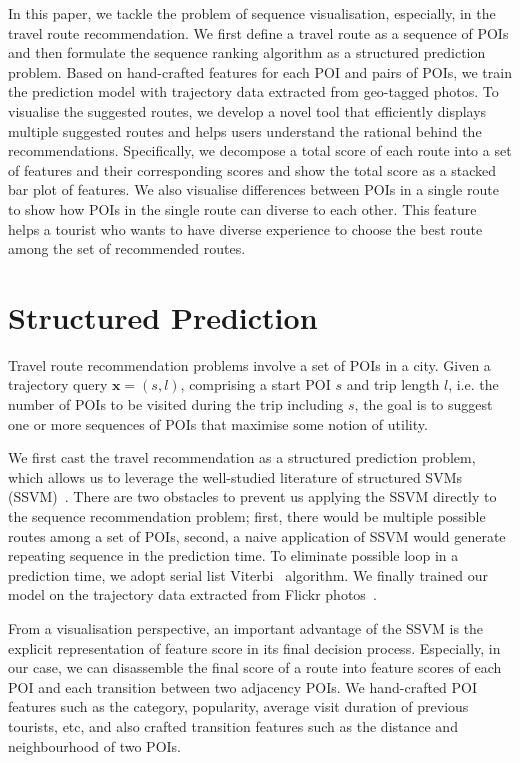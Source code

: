 \documentclass[sigconf]{acmart}
\begin{document}
In this paper, we tackle the problem of sequence visualisation, especially, in the travel route recommendation. We first define a travel route as a sequence of POIs and then formulate the sequence ranking algorithm as a structured prediction problem. Based on hand-crafted features for each POI and pairs of POIs, we train the prediction model with trajectory data extracted from geo-tagged photos. To visualise the suggested routes, we develop a novel tool that efficiently displays multiple suggested routes and helps users understand the rational behind the recommendations. Specifically, we decompose a total score of each route into a set of features and their corresponding scores and show the total score as a stacked bar plot of features. We also visualise differences between POIs in a single route to show how POIs in the single route can diverse to each other. This feature helps a tourist who wants to have diverse experience to choose the best route among the set of recommended routes.

\section{Structured Prediction}
Travel route recommendation problems involve a set of POIs in a city. Given a trajectory query $\mathbf{x} = (s, l)$, comprising a start POI $s$ and trip length $l$, i.e. the number of POIs to be visited during the trip including $s$, the goal is to suggest one or more sequences of POIs that maximise some notion of utility.

We first cast the travel recommendation as a structured prediction problem, which allows us to leverage the well-studied literature of structured SVMs (SSVM)~\cite{tsochantaridis2005large,joachims2009predicting}. There are two obstacles to prevent us applying the SSVM directly to the sequence recommendation problem; first, there would be multiple possible routes among a set of POIs, second, a naive application of SSVM would generate repeating sequence in the prediction time. 
To eliminate possible loop in a prediction time, we adopt serial list Viterbi~\cite{seshadri1994list,nill1995list} algorithm.
We finally trained our model on the trajectory data extracted from Flickr photos~\cite{chen2016learning}.

From a visualisation perspective, an important advantage of the SSVM is the explicit representation of feature score in its final decision process. Especially, in our case, we can disassemble the final score of a route into feature scores of each POI and each transition between two adjacency POIs. We hand-crafted POI features such as the category, popularity, average visit duration of previous tourists, etc, and also crafted transition features such as the distance and neighbourhood of two POIs.
\end{document}

